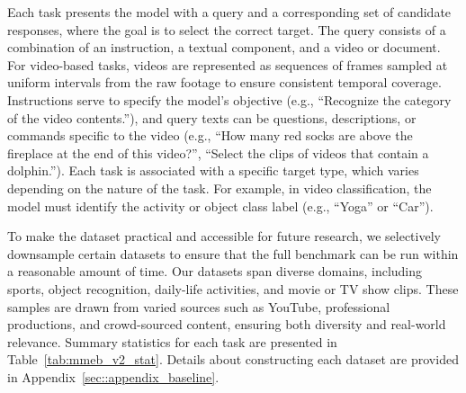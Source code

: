 Each task presents the model with a query and a corresponding set of candidate responses, where the goal is to select the correct target. The query consists of a combination of an instruction, a textual component, and a video or document. For video-based tasks, videos are represented as sequences of frames sampled at uniform intervals from the raw footage to ensure consistent temporal coverage. Instructions serve to specify the model's objective (e.g., ``Recognize the category of the video contents.''), and query texts can be questions, descriptions, or commands specific to the video (e.g., ``How many red socks are above the fireplace at the end of this video?'', ``Select the clips of videos that contain a dolphin.''). Each task is associated with a specific target type, which varies depending on the nature of the task. For example, in video classification, the model must identify the activity or object class label (e.g., ``Yoga'' or ``Car'').

To make the dataset practical and accessible for future research, we selectively downsample certain datasets to ensure that the full benchmark can be run within a reasonable amount of time. Our datasets span diverse domains, including sports, object recognition, daily-life activities, and movie or TV show clips. These samples are drawn from varied sources such as YouTube, professional productions, and crowd-sourced content, ensuring both diversity and real-world relevance. Summary statistics for each task are presented in Table~\ref{tab:mmeb_v2_stat}. Details about constructing each dataset are provided in Appendix~\ref{sec::appendix_baseline}.

